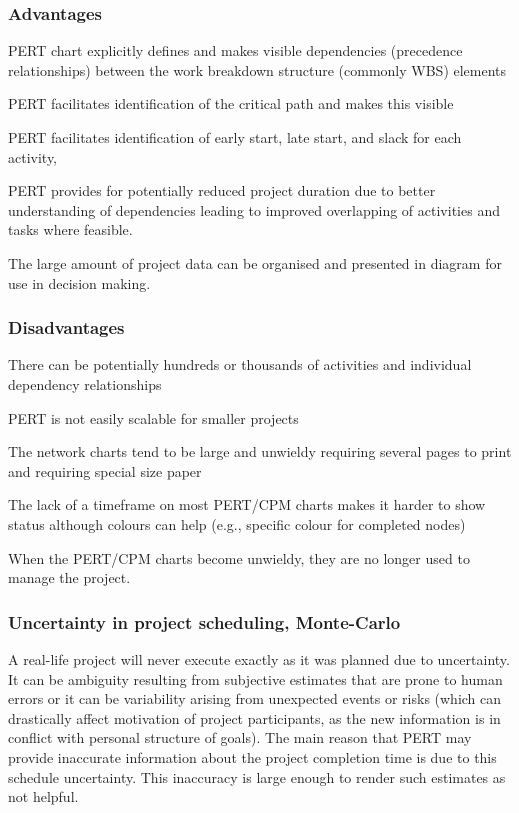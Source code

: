 \subsubsection{Advantages}
\begin{compactitem}
\item PERT chart explicitly defines and makes visible dependencies (precedence relationships) between the work breakdown structure (commonly WBS) elements
\item PERT facilitates identification of the critical path and makes this visible
\item PERT facilitates identification of early start, late start, and slack for each activity,
\item PERT provides for potentially reduced project duration due to better understanding of dependencies leading to improved overlapping of activities and tasks where feasible.
\item The large amount of project data can be organised and presented in diagram for use in decision making.
\end{compactitem}

\subsubsection{Disadvantages}
\begin{compactitem}
\item There can be potentially hundreds or thousands of activities and individual dependency relationships
\item PERT is not easily scalable for smaller projects
\item The network charts tend to be large and unwieldy requiring several pages to print and requiring special size paper
\item The lack of a timeframe on most PERT/CPM charts makes it harder to show status although colours can help (e.g., specific colour for completed nodes)
\item When the PERT/CPM charts become unwieldy, they are no longer used to manage the project.
\end{compactitem}

\subsubsection{Uncertainty in project scheduling, Monte-Carlo}

A real-life project will never execute exactly as it was planned due to uncertainty. It can be ambiguity resulting from subjective estimates that are prone to human errors or it can be variability arising from unexpected events or risks (which can drastically affect motivation of project participants, as the new information is in conflict with personal structure of goals). The main reason that PERT may provide inaccurate information about the project completion time is due to this schedule uncertainty. This inaccuracy is large enough to render such estimates as not helpful.

